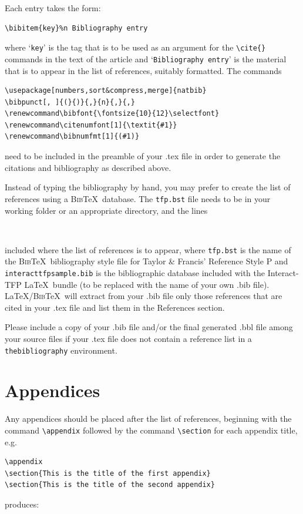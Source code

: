 \documentclass[]{interact}
\renewcommand\bibfont{\fontsize{10}{12}\selectfont}%
\renewcommand\citenumfont[1]{\textit{#1}}%
\renewcommand\bibnumfmt[1]{(#1)}%
\theoremstyle{plain}%
\theoremstyle{definition}
\theoremstyle{remark}
\begin{document}
\bigskip
\noindent Each entry takes the form:
\begin{verbatim}
\bibitem{key}%n Bibliography entry
\end{verbatim}
where `\texttt{key}' is the tag that is to be used as an argument for the \verb"\cite{}" commands in the text of the article and `\texttt{Bibliography entry}' is the material that is to appear in the list of references, suitably formatted. The commands
\begin{verbatim}
\usepackage[numbers,sort&compress,merge]{natbib}
\bibpunct[, ]{(}{)}{,}{n}{,}{,}
\renewcommand\bibfont{\fontsize{10}{12}\selectfont}
\renewcommand\citenumfont[1]{\textit{#1}}
\renewcommand\bibnumfmt[1]{(#1)}
\end{verbatim}
need to be included in the preamble of your .tex file in order to generate the citations and bibliography as described above.

Instead of typing the bibliography by hand, you may prefer to create the list of references using a \textsc{Bib}\TeX\ database. The \texttt{tfp.bst} file needs to be in your working folder or an appropriate directory, and the lines
\begin{verbatim}


\end{verbatim}
included where the list of references is to appear, where \texttt{tfp.bst} is the name of the \textsc{Bib}\TeX\ bibliography style file for Taylor \& Francis' Reference Style P and \texttt{interacttfpsample.bib} is the bibliographic database included with the \textsf{Interact}-TFP \LaTeX\ bundle (to be replaced with the name of your own .bib file). \LaTeX/\textsc{Bib}\TeX\ will extract from your .bib file only those references that are cited in your .tex file and list them in the References section.

Please include a copy of your .bib file and/or the final generated .bbl file among your source files if your .tex file does not contain a reference list in a \texttt{thebibliography} environment.


\section{Appendices}

Any appendices should be placed after the list of references, beginning with the command \verb"\appendix" followed by the command \verb"\section" for each appendix title, e.g.
\begin{verbatim}
\appendix
\section{This is the title of the first appendix}
\section{This is the title of the second appendix}
\end{verbatim}
produces:\medskip
\end{document}
